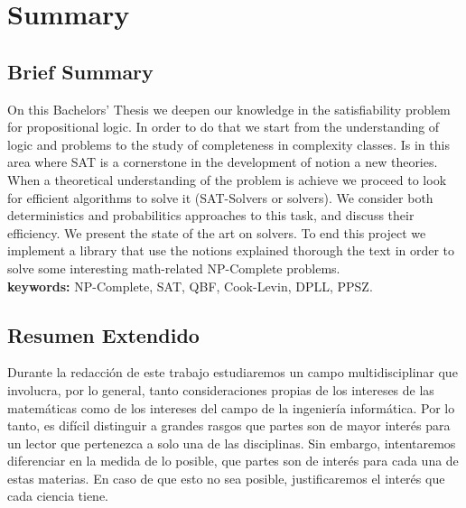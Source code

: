 
\newpage



\chapter*{Summary}
\section*{Brief Summary}

On this Bachelors' Thesis we deepen our knowledge in the satisfiability problem for propositional logic. In order to do that we start from the understanding of logic and problems to the study of completeness in complexity classes. Is in this area where SAT is a cornerstone in the development of notion a new theories. When a theoretical understanding of the problem is achieve we proceed to look for efficient algorithms to solve it (SAT-Solvers or solvers). We consider both deterministics and probabilitics approaches to this task, and discuss their efficiency. We present the state of the art on solvers. To end this project we implement a library that use the notions explained thorough the text in order to solve some interesting math-related NP-Complete problems.\\

\textbf{keywords:} NP-Complete, SAT, QBF, Cook-Levin, DPLL, PPSZ.



\section*{Resumen Extendido}

Durante la redacción de este trabajo estudiaremos un campo multidisciplinar que involucra, por lo general, tanto consideraciones propias de los intereses de las matemáticas como de los intereses del campo de la ingeniería informática. Por lo tanto, es difícil distinguir a grandes rasgos que partes son de mayor interés para un lector que pertenezca a solo una de las disciplinas. Sin embargo, intentaremos diferenciar en la medida de lo posible, que partes son de interés para cada una de estas materias. En caso de que esto no sea posible, justificaremos el interés que cada ciencia tiene.\\

